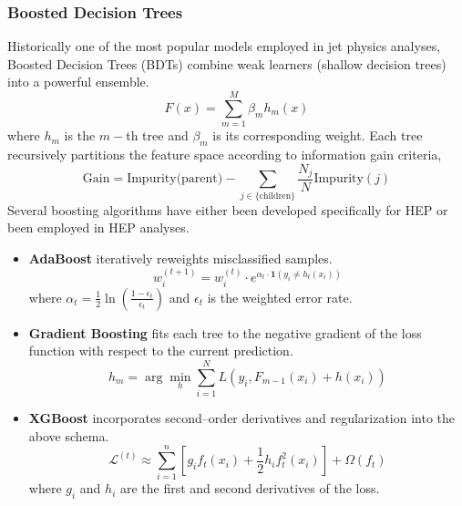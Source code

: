     \subsubsection{Boosted Decision Trees}
        Historically one of the most popular models employed in jet physics analyses, Boosted Decision Trees (BDTs) combine weak learners (shallow decision trees) into a powerful ensemble.
        \begin{equation}
            F(x) = \sum_{m=1}^M \beta_m h_m(x)
        \end{equation}
        where \(h_m\) is the \(m-\)th tree and \(\beta_m\) is its corresponding weight.
        Each tree recursively partitions the feature space according to information gain criteria,
        \begin{equation}
            \text{Gain} = \text{Impurity(parent)} - \sum_{j \in \{\text{children}\}} \frac{N_j}{N} \text{Impurity}(j)
        \end{equation}
        Several boosting algorithms have either been developed specifically for HEP or been employed in HEP analyses.
        \begin{itemize}
            \item \textbf{AdaBoost} iteratively reweights misclassified samples.
            \begin{equation}
                w_i^{(t+1)} = w_i^{(t)} \cdot e^{\alpha_t \cdot \mathbf{1}(y_i \neq h_t(x_i))}
            \end{equation}
            where \(\alpha_t = \frac{1}{2}\ln\left(\frac{1-\epsilon_t}{\epsilon_t}\right)\) and \(\epsilon_t\) is the weighted error rate.
            \item \textbf{Gradient Boosting} fits each tree to the negative gradient of the loss function with respect to the current prediction.
            \begin{equation}
                h_m = \arg\min_h \sum_{i=1}^N L(y_i, F_{m-1}(x_i) + h(x_i))
            \end{equation}
            \item \textbf{XGBoost} incorporates second--order derivatives and regularization into the above schema.
            \begin{equation}
                \mathcal{L}^{(t)} \approx \sum_{i=1}^n [g_i f_t(x_i) + \frac{1}{2} h_i f_t^2(x_i)] + \Omega(f_t)
            \end{equation}
        where \(g_i\) and \(h_i\) are the first and second derivatives of the loss.
        \end{itemize}
        

